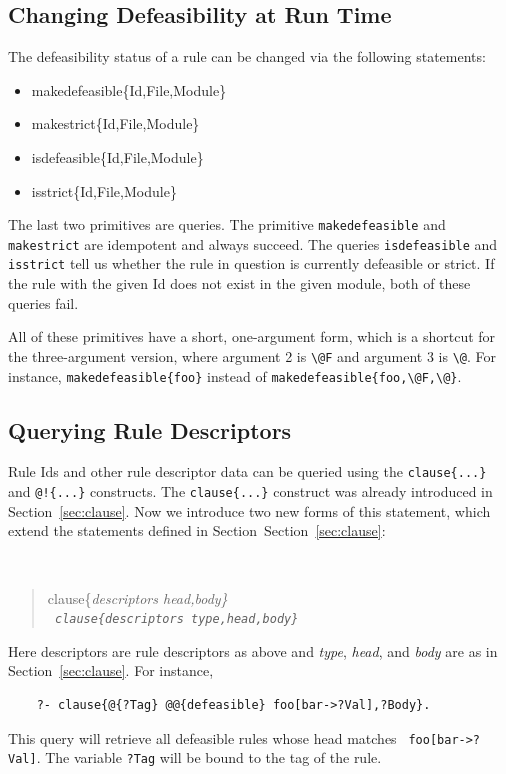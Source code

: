 \documentclass[11pt]{article}
\newcommand{\bs}{\textbackslash}
\begin{document}

\subsection{Changing Defeasibility at Run Time}
The defeasibility status of a rule can be changed via the following
statements:
\begin{itemize}
\item  makedefeasible\{Id,File,Module\}
\item  makestrict\{Id,File,Module\}
\item  isdefeasible\{Id,File,Module\}
\item  isstrict\{Id,File,Module\}
\end{itemize}
The last two primitives are queries. The primitive \texttt{makedefeasible}
and \texttt{makestrict} are idempotent and always succeed. The queries
\texttt{isdefeasible} and \texttt{isstrict} tell us whether the rule in
question is currently defeasible or strict.    
If the rule with the given Id does not exist in the given module, both of
these queries fail.

All of these primitives have a short, one-argument form, which is a
shortcut for the three-argument version, where argument 2 is \texttt{\bs{}@F}
and argument 3 is \texttt{\bs{}@}. For instance,
\texttt{makedefeasible\{foo\}} instead of
\texttt{makedefeasible\{foo,\bs{}@F,\bs{}@\}}. 

\subsection{Querying Rule Descriptors}\label{sec-descr-queries}

Rule Ids and other rule descriptor
data can be queried using the  \texttt{clause\{...\}}
and \texttt{@!\{...\}} constructs. The  \texttt{clause\{...\}}
construct was already
introduced in Section~\ref{sec:clause}. Now we introduce two new forms of this
statement, which extend the statements
defined in Section~Section~\ref{sec:clause}:
{\tt
\begin{quote}
clause\{\it{descriptors head,body}\}\\
\tt
clause\{\it{descriptors type,head,body}\}
\end{quote}
}
Here descriptors are rule descriptors as above and
\emph{type}, \emph{head}, and \emph{body} are as in
Section~\ref{sec:clause}. 
For instance,
\begin{verbatim}
    ?- clause{@{?Tag} @@{defeasible} foo[bar->?Val],?Body}.
\end{verbatim}
This query will retrieve all defeasible rules whose head matches {\tt
  foo[bar->?Val]}. The variable \texttt{?Tag} will be bound to the tag of
the rule. 
\end{document}
